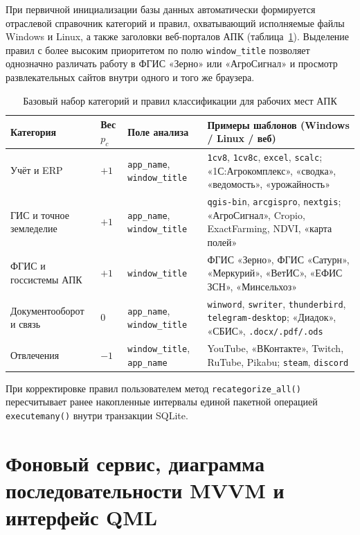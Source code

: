 \documentclass{timcw}
\begin{document}
При первичной инициализации базы данных автоматически формируется отраслевой справочник категорий и правил, охватывающий исполняемые файлы Windows и Linux, а также заголовки веб-порталов АПК (таблица~\ref{tab:apk_presets}). Выделение правил с более высоким приоритетом по полю \texttt{window\_title} позволяет однозначно различать работу в ФГИС «Зерно» или «АгроСигнал» и просмотр развлекательных сайтов внутри одного и того же браузера.

\begin{table}[H]
\centering
\caption{Базовый набор категорий и правил классификации для рабочих мест АПК}
\label{tab:apk_presets}
\footnotesize
\begin{tabularx}{\textwidth}{>{\raggedright\arraybackslash}p{3.4cm} >{\centering\arraybackslash}p{1.6cm} >{\raggedright\arraybackslash}p{2.3cm} >{\raggedright\arraybackslash}X}
\toprule
\textbf{Категория} & \textbf{Вес $p_c$} & \textbf{Поле анализа} & \textbf{Примеры шаблонов (Windows / Linux / веб)} \\
\midrule
Учёт и ERP & $+1$ & \texttt{app\_name}, \texttt{window\_title} & \texttt{1cv8}, \texttt{1cv8c}, \texttt{excel}, \texttt{scalc}; «1С:Агрокомплекс», «сводка», «ведомость», «урожайность» \\
\addlinespace
ГИС и точное земледелие & $+1$ & \texttt{app\_name}, \texttt{window\_title} & \texttt{qgis-bin}, \texttt{arcgispro}, \texttt{nextgis}; «АгроСигнал», Cropio, ExactFarming, NDVI, «карта полей» \\
\addlinespace
ФГИС и госсистемы АПК & $+1$ & \texttt{window\_title} & ФГИС «Зерно», ФГИС «Сатурн», «Меркурий», «ВетИС», «ЕФИС ЗСН», «Минсельхоз» \\
\addlinespace
Документооборот и связь & $0$ & \texttt{app\_name}, \texttt{window\_title} & \texttt{winword}, \texttt{swriter}, \texttt{thunderbird}, \texttt{telegram-desktop}; «Диадок», «СБИС», \texttt{.docx/.pdf/.ods} \\
\addlinespace
Отвлечения & $-1$ & \texttt{window\_title}, \texttt{app\_name} & YouTube, «ВКонтакте», Twitch, RuTube, Pikabu; \texttt{steam}, \texttt{discord} \\
\bottomrule
\end{tabularx}
\end{table}

При корректировке правил пользователем метод \texttt{recategorize\_all()} пересчитывает ранее накопленные интервалы единой пакетной операцией \texttt{executemany()} внутри транзакции SQLite.

\section{Фоновый сервис, диаграмма последовательности MVVM и интерфейс QML}
\end{document}
